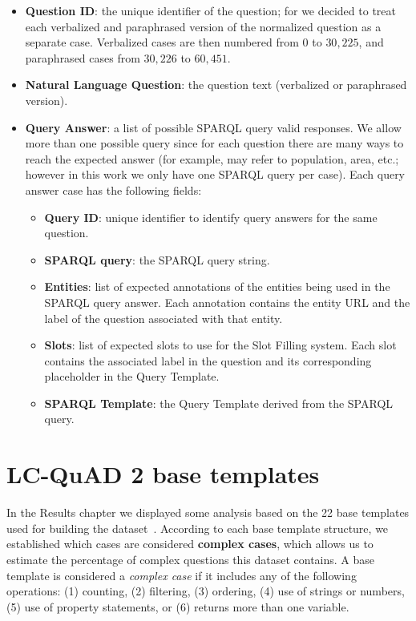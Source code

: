 \begin{itemize}
    \item \textbf{Question ID}: the unique identifier of the question; for \LCQuADtwo{} we decided to 
    treat each verbalized and paraphrased version of the normalized question as a separate case. 
    Verbalized cases are then numbered from $0$ to $30,225$, and paraphrased cases from $30,226$ to 
    $60,451$.
    \item \textbf{Natural Language Question}: the question text (verbalized or paraphrased version).
    \item \textbf{Query Answer}: a list of possible SPARQL query valid responses. We allow more than 
    one possible query since for each question there are many ways to reach the expected answer (for 
    example,  may refer to population, area, etc.; however in 
    this work we only have one SPARQL query per case). Each query answer case has the following fields:
    \begin{itemize}
        \item \textbf{Query ID}: unique identifier to identify query answers for the same question.
        \item \textbf{SPARQL query}: the SPARQL query string.
        \item \textbf{Entities}: list of expected annotations of the entities being used in the 
        SPARQL query answer. Each annotation contains the entity URL and the label of the question 
        associated with that entity.
        \item \textbf{Slots}: list of expected slots to use for the Slot Filling system. Each slot 
        contains the associated label in the question and its corresponding placeholder in the Query 
        Template.
        \item \textbf{SPARQL Template}: the Query Template derived from the SPARQL query.
    \end{itemize}
\end{itemize}

\section{LC-QuAD 2 base templates}
\label{appendix:qaDataset/baseTemplates}
In the Results chapter we displayed some analysis based on the 22 base templates used for building 
the \LCQuADtwo{} dataset~\cite{dataset:lcquad2-DubeyBA019}. According to each base template structure, 
we established which cases are considered \textbf{complex cases}, which allows us to estimate the 
percentage of complex questions this dataset contains. A base template is considered a \textit{complex 
case} if it includes any of the following operations: (1) counting, (2) filtering, (3) ordering, 
(4) use of strings or numbers,(5) use of property statements, or (6) returns more than one variable. 

